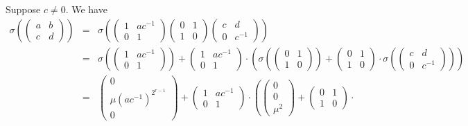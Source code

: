 Suppose $c\neq0$. We have
\begin{eqnarray*}
\sigma\left(\left(\begin{matrix} a & b \\ c & d \end{matrix}\right)\right) 
&=&
\sigma\left(
	\left(\begin{matrix} 1 & ac^{-1} \\ 0 & 1 \end{matrix}\right)
	\left(\begin{matrix} 0 & 1 \\ 1 & 0 \end{matrix}\right)
	\left(\begin{matrix} c & d \\ 0 & c^{-1} \end{matrix}\right)
\right) \\
&=&
\sigma\left(
	\left(\begin{matrix} 1 & ac^{-1} \\ 0 & 1 \end{matrix}\right)
\right) +
\left(\begin{matrix} 1 & ac^{-1} \\ 0 & 1 \end{matrix}\right) \cdot
\left(
	\sigma\left(
		\left(\begin{matrix} 0 & 1 \\ 1 & 0 \end{matrix}\right)
	\right) +
	\left(\begin{matrix} 0 & 1 \\ 1 & 0 \end{matrix}\right) \cdot
	\sigma\left(
		\left(\begin{matrix} c & d \\ 0 & c^{-1} \end{matrix}\right)
	\right)
\right) \\
&=&
\left(\begin{matrix} 0 \\ \mu(ac^{-1})^{2^{r-1}} \\ 0 \end{matrix}\right)
+
\left(\begin{matrix} 1 & ac^{-1} \\ 0 & 1 \end{matrix}\right) \cdot
\left(
	\left(\begin{matrix} 0 \\ 0 \\ \mu^2 \end{matrix}\right)
	+
	\left(\begin{matrix} 0 & 1 \\ 1 & 0 \end{matrix}\right) \cdot

\end{eqnarray*}
